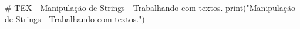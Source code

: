 # TEX - Manipulação de Strings - Trabalhando com textos.
print("Manipulação de Strings - Trabalhando com textos.")
